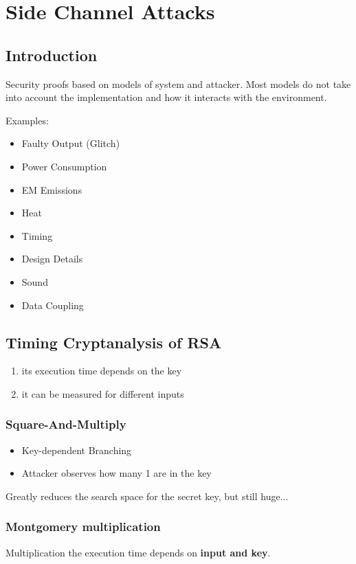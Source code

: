 
\section{Side Channel Attacks}
\subsection{Introduction}
Security proofs based on models of system and attacker. Most models do not take
into account the implementation and how it interacts with the environment.

Examples:
\begin{itemize}
  \item Faulty Output (Glitch)
  \item Power Consumption
  \item EM Emissions
  \item Heat
  \item Timing
  \item Design Details
  \item Sound
  \item Data Coupling
\end{itemize}

\subsection{Timing Cryptanalysis of RSA}
\begin{enumerate}
  \item its execution time depends on the key
  \item  it can be measured for different inputs
\end{enumerate}

\subsubsection{Square-And-Multiply}

\begin{itemize}
  \item Key-dependent Branching
  \item Attacker observes how many 1 are in the key
\end{itemize}
Greatly reduces the search space for the secret key, but still huge...

\subsubsection{Montgomery multiplication}
Multiplication the execution time depends on \textbf{input and key}.

